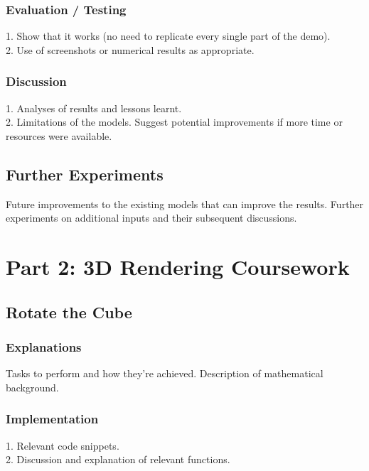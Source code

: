 \documentclass[10pt,twocolumn,letterpaper]{article}
\begin{document}
\subsubsection{Evaluation / Testing}
1. Show that it works (no need to replicate every single part of the demo). \\
2. Use of screenshots or numerical results as appropriate.

\subsubsection{Discussion}
1. Analyses of results and lessons learnt. \\
2. Limitations of the models. Suggest potential improvements if more time or resources were available.

\subsection{Further Experiments}
Future improvements to the existing models that can improve the results. Further experiments on additional inputs and their subsequent discussions.

\section{Part 2: 3D Rendering Coursework}

\subsection{Rotate the Cube}
\subsubsection{Explanations}
Tasks to perform and how they're achieved. Description of mathematical background.

\subsubsection{Implementation}
1. Relevant code snippets. \\
2. Discussion and explanation of relevant functions.
\end{document}
